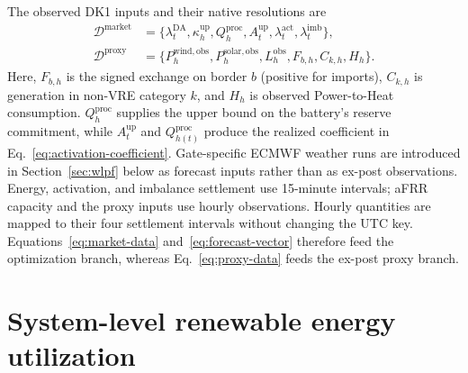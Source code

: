 \documentclass[11pt,a4paper]{article}
\begin{document}
The observed DK1 inputs and their native resolutions are
\begin{align}
  \mathcal{D}^{\mathrm{market}}
  &=\{\lambda^{\mathrm{DA}}_t,
      \kappa^{\mathrm{up}}_h,
      Q^{\mathrm{proc}}_h,
      A^{\mathrm{up}}_t,
      \lambda^{\mathrm{act}}_t,
      \lambda^{\mathrm{imb}}_t\},
  \label{eq:market-data}\\
  \mathcal{D}^{\mathrm{proxy}}
  &=\{P^{\mathrm{wind,obs}}_h,
      P^{\mathrm{solar,obs}}_h,
      L^{\mathrm{obs}}_h,
      F_{b,h},C_{k,h},H_h\}.
  \label{eq:proxy-data}
\end{align}
Here, $F_{b,h}$ is the signed exchange on border $b$ (positive for imports),
$C_{k,h}$ is generation in non-VRE category $k$, and $H_h$ is observed
Power-to-Heat consumption.  $Q^{\mathrm{proc}}_h$ supplies the upper bound on
the battery's reserve commitment, while $A^{\mathrm{up}}_t$ and
$Q^{\mathrm{proc}}_{h(t)}$ produce the realized coefficient in
Eq.~\eqref{eq:activation-coefficient}.  Gate-specific ECMWF weather runs are introduced
in Section~\ref{sec:wlpf} below as forecast inputs rather than as ex-post observations.
Energy, activation, and imbalance settlement use 15-minute intervals; aFRR
capacity and the proxy inputs use hourly observations.  Hourly quantities are
mapped to their four settlement intervals without changing the UTC key.
Equations~\eqref{eq:market-data} and~\eqref{eq:forecast-vector} therefore feed
the optimization branch, whereas Eq.~\eqref{eq:proxy-data} feeds the ex-post
proxy branch.

\section{System-level renewable energy utilization}
\end{document}
